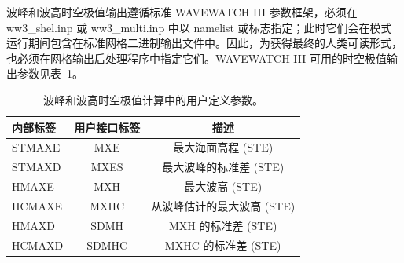 波峰和波高时空极值输出遵循标准 WAVEWATCH III 参数框架，必须在 {\file ww3\_shel.inp} 或 {\file ww3\_multi.inp} 中以 namelist 或标志指定；此时它们会在模式运行期间包含在标准网格二进制输出文件中。因此，为获得最终的人类可读形式，也必须在网格输出后处理程序中指定它们。WAVEWATCH III 可用的时空极值输出参数见表~\ref{tab:ste_parm}。

\begin{table}[h]
\begin{center} \begin{tabular}{|l|c|c|} \hline \hline
内部标签 & 用户接口标签 & 描述 \\ \hline
STMAXE  &   MXE   & 最大海面高程 (STE) \\
STMAXD  &   MXES  & 最大波峰的标准差 (STE) \\
HMAXE   &   MXH   & 最大波高 (STE) \\
HCMAXE  &   MXHC  & 从波峰估计的最大波高 (STE) \\
HMAXD   &   SDMH  & MXH 的标准差 (STE) \\
HCMAXD  &   SDMHC & MXHC 的标准差 (STE) \\ \hline
\end{tabular}
\end{center}
\caption{波峰和波高时空极值计算中的用户定义参数。}
\label{tab:ste_parm} \botline \end{table}
